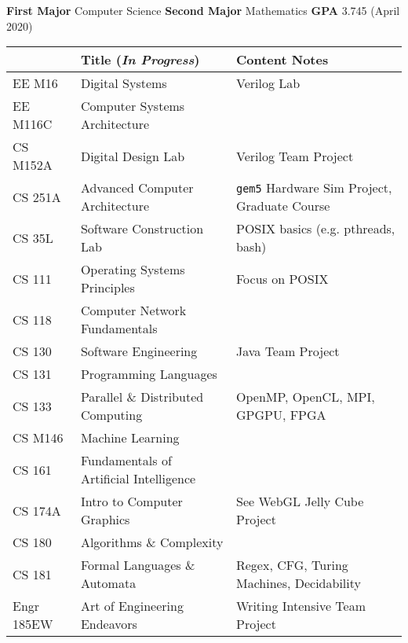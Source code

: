 \documentclass[11pt]{article}
\begin{document}
\textbf{First Major} Computer Science \hfill\textbf{Second Major}
Mathematics \hfill\textbf{GPA} 3.745 (April 2020) %



\begin{tabular}{l l l}
\hline
 & Title (\textit{In Progress}) & Content Notes \\
\hline
EE M16 & Digital Systems & Verilog Lab \\
EE M116C & Computer Systems Architecture & \\
CS M152A & Digital Design Lab & Verilog Team Project \\
CS 251A & Advanced Computer Architecture & \texttt{gem5} Hardware Sim Project, Graduate Course \\
\hline
CS 35L & Software Construction Lab & POSIX basics (e.g. pthreads, bash) \\
CS 111 & Operating Systems Principles & Focus on POSIX \\
CS 118 & Computer Network Fundamentals & \\
CS 130 & Software Engineering & Java Team Project \\
CS 131 & Programming Languages & \\
CS 133 & Parallel \& Distributed Computing & OpenMP, OpenCL, MPI, GPGPU, FPGA \\
CS M146 & Machine Learning & \\
CS 161 & Fundamentals of Artificial Intelligence & \\
CS 174A & Intro to Computer Graphics & See WebGL Jelly Cube Project \\
CS 180 & Algorithms \& Complexity & \\
CS 181 & Formal Languages \& Automata & Regex, CFG, Turing Machines, Decidability \\
\hline
Engr 185EW & Art of Engineering Endeavors & Writing Intensive Team Project \\
\hline



\end{tabular}
\end{document}
